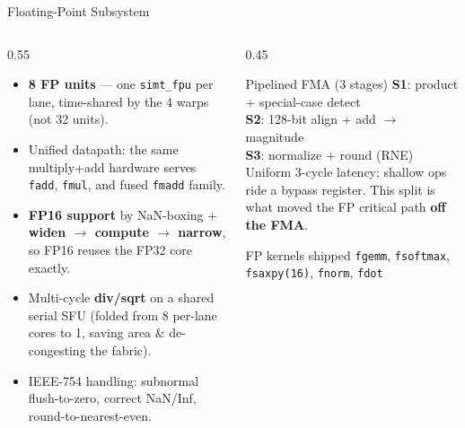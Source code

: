 \documentclass[aspectratio=169,11pt]{beamer}
\newcommand{\hl}[1]{{\color{simtixaccent}\textbf{#1}}}
\newcommand{\navy}[1]{{\color{simtixblue}\textbf{#1}}}
\begin{document}
\begin{frame}{Floating-Point Subsystem}
  \begin{columns}[T]
    \begin{column}{0.55\textwidth}
      \begin{itemize}
        \item \hl{8 FP units} --- one \texttt{simt\_fpu} per lane, time-shared by the 4 warps
          (not 32 units).
        \item Unified datapath: the same multiply+add hardware serves \texttt{fadd}, \texttt{fmul},
          and fused \texttt{fmadd} family.
        \item \hl{FP16 support} by NaN-boxing + \navy{widen $\rightarrow$ compute $\rightarrow$
          narrow}, so FP16 reuses the FP32 core exactly.
        \item Multi-cycle \hl{div/sqrt} on a shared serial SFU (folded from 8 per-lane cores to
          1, saving area \& de-congesting the fabric).
        \item IEEE-754 handling: subnormal flush-to-zero, correct NaN/Inf, round-to-nearest-even.
      \end{itemize}
    \end{column}
    \begin{column}{0.45\textwidth}
      \begin{block}{Pipelined FMA (3 stages)}
        \small
        \textbf{S1}: product + special-case detect\\
        \textbf{S2}: 128-bit align + add $\rightarrow$ magnitude\\
        \textbf{S3}: normalize + round (RNE)\\[0.4em]
        Uniform 3-cycle latency; shallow ops ride a bypass register. This split is what moved the
        FP critical path \hl{off the FMA}.
      \end{block}
      \begin{block}{FP kernels shipped}
        \small \texttt{fgemm}, \texttt{fsoftmax}, \texttt{fsaxpy(16)}, \texttt{fnorm}, \texttt{fdot}
      \end{block}
    \end{column}
  \end{columns}
\end{frame}
\end{document}
